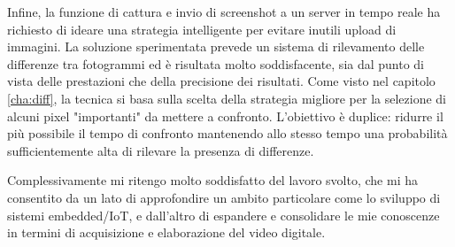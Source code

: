 Infine, la funzione di cattura e invio di screenshot a un server in tempo reale ha richiesto di ideare una strategia intelligente per evitare inutili upload di immagini. La soluzione sperimentata prevede un sistema di rilevamento delle differenze tra fotogrammi ed è risultata molto soddisfacente, sia dal punto di vista delle prestazioni che della precisione dei risultati. Come visto nel capitolo \ref{cha:diff}, la tecnica si basa sulla scelta della strategia migliore per la selezione di alcuni pixel "importanti" da mettere a confronto. L'obiettivo è duplice: ridurre il più possibile il tempo di confronto mantenendo allo stesso tempo una probabilità sufficientemente alta di rilevare la presenza di differenze.

Complessivamente mi ritengo molto soddisfatto del lavoro svolto, che mi ha consentito da un lato di approfondire un ambito particolare come lo sviluppo di sistemi embedded/IoT, e dall'altro di espandere e consolidare le mie conoscenze in termini di acquisizione e elaborazione del video digitale.

